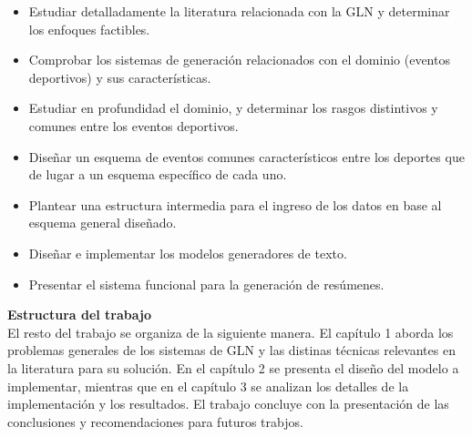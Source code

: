     \begin{itemize}
        \item Estudiar detalladamente la literatura relacionada con la GLN y determinar los enfoques factibles. 
        \item Comprobar los sistemas de generación relacionados con el dominio (eventos deportivos) y sus caracter\'isticas.
        \item Estudiar en profundidad el dominio, y determinar los rasgos distintivos y comunes entre los eventos deportivos.
        \item Diseñar un esquema de eventos comunes característicos entre los deportes que de lugar a un esquema específico de cada uno.
        \item Plantear una estructura intermedia para el ingreso de los datos en base al esquema general diseñado. 
        \item Diseñar e implementar los modelos generadores de texto.
        \item Presentar el sistema funcional para la generación de resúmenes.       
    \end{itemize}

    \textbf{Estructura del trabajo}\\

    El resto del trabajo se organiza de la siguiente manera. El capítulo 1 aborda los problemas generales de los sistemas de GLN 
y las distinas técnicas relevantes en la literatura para su solución. En el capítulo 2 se presenta el diseño del modelo a implementar, mientras 
que en el capítulo 3 se analizan los detalles de la implementación y los resultados. El trabajo concluye con la presentación de las 
conclusiones y recomendaciones para futuros trabjos.